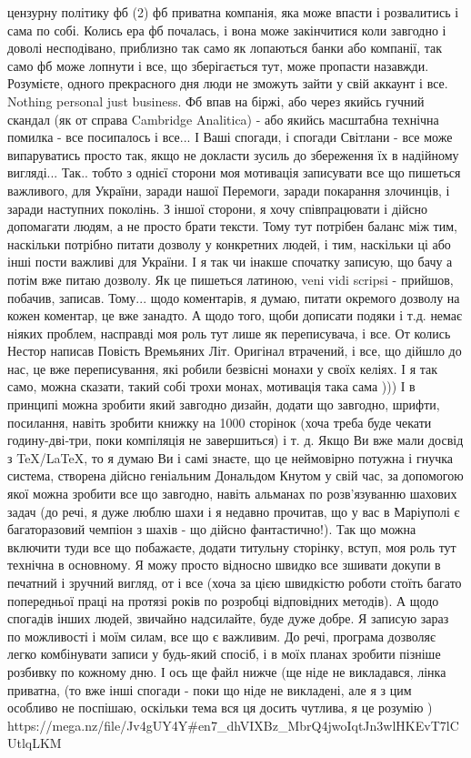цензурну політику фб (2) фб приватна компанія, яка може впасти і розвалитись і
сама по собі. Колись ера фб почалась, і вона може закінчитися коли завгодно і
доволі несподівано, приблизно так само як лопаються банки або компанії, так
само фб може лопнути і все, що
зберігається тут, може пропасти назавжди. Розумієте, одного прекрасного дня
люди не зможуть зайти у свій аккаунт і все. Nothing personal just business. Фб
впав на біржі, або через якийсь гучний скандал (як от справа Cambridge
Analitica) - або якийсь масштабна технічна помилка - все посипалось і все...  І
Ваші спогади, і спогади Світлани - все може випаруватись просто так, якщо не
докласти зусиль до збереження їх в надійному вигляді...  Так.. тобто з однієї
сторони моя мотивація записувати все що пишеться важливого, для України, заради
нашої Перемоги, заради покарання злочинців, і заради наступних поколінь.  З
іншої сторони, я хочу співпрацювати і дійсно допомагати людям, а не просто
брати тексти. Тому тут потрібен баланс між тим, наскільки потрібно питати
дозволу у конкретних людей, і тим, наскільки ці або інші пости важливі для
України. І я так чи інакше спочатку записую, що бачу а потім вже питаю дозволу.
Як це пишеться латиною, veni vidi scripsi - прийшов, побачив, записав. Тому...
щодо коментарів, я думаю, питати окремого дозволу на кожен коментар, це вже
занадто. А щодо того, щоби дописати подяки і т.д. немає ніяких проблем,
насправді моя роль тут лише як переписувача, і все. От колись Нестор написав
Повість Времьяних Літ.  Оригінал втрачений, і все, що дійшло до нас, це вже
переписування, які робили безвісні монахи у своїх келіях. І я так само, можна
сказати, такий собі трохи монах, мотивація така сама )))  І в принципі можна
зробити який завгодно дизайн, додати що завгодно, шрифти, посилання, навіть
зробити книжку на 1000 сторінок (хоча треба буде чекати годину-дві-три, поки
компіляція не завершиться) і т. д.  Якщо Ви вже мали досвід з TeX/LaTeX, то я
думаю Ви і самі знаєте, що це неймовірно потужна і гнучка система, створена
дійсно геніальним Дональдом Кнутом у свій час, за допомогою якої можна зробити
все що завгодно, навіть альманах по розв'язуванню шахових задач (до речі, я дуже люблю шахи 
і я недавно прочитав, що у вас в Маріуполі є багаторазовий чемпіон з шахів - що
дійсно фантастично!).  Так що можна включити туди все що побажаєте, додати
титульну сторінку, вступ, моя роль тут технічна в основному. Я можу просто
відносно швидко все зшивати докупи в печатний і зручний вигляд, от і все (хоча
за цією швидкістю роботи стоїть багато попередньої праці на протязі років по
розробці відповідних методів). А щодо спогадів інших людей, звичайно
надсилайте, буде дуже добре. Я записую зараз по можливості і моїм силам, все що
є важливим. До речі, програма дозволяє легко комбінувати записи у будь-який
спосіб, і в моїх планах зробити пізніше розбивку по кожному дню. І ось ще файл
нижче (ще ніде не викладався, лінка приватна, (то вже інші спогади - поки що
ніде не викладені, але я з цим особливо не поспішаю, оскільки тема вся ця
досить чутлива, я це розумію )
https://mega.nz/file/Jv4gUY4Y#en7_dhVIXBz_MbrQ4jwoIqtJn3wlHKEvT7lCUtlqLKM

